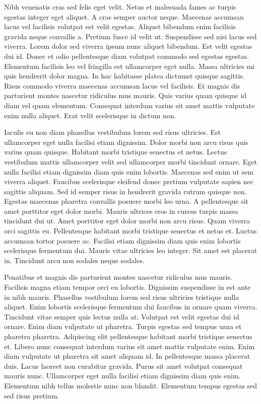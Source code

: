 \documentclass[11pt,a4paper]{article}
\begin{document}
Nibh venenatis cras sed felis eget velit. Netus et malesuada fames ac turpis egestas integer eget aliquet. A cras semper auctor neque. Maecenas accumsan lacus vel facilisis volutpat est velit egestas. Aliquet bibendum enim facilisis gravida neque convallis a. Pretium fusce id velit ut. Suspendisse sed nisi lacus sed viverra. Lorem dolor sed viverra ipsum nunc aliquet bibendum. Est velit egestas dui id. Donec et odio pellentesque diam volutpat commodo sed egestas egestas. Elementum facilisis leo vel fringilla est ullamcorper eget nulla. Massa ultricies mi quis hendrerit dolor magna. In hac habitasse platea dictumst quisque sagittis. Risus commodo viverra maecenas accumsan lacus vel facilisis. Et magnis dis parturient montes nascetur ridiculus mus mauris. Quis varius quam quisque id diam vel quam elementum. Consequat interdum varius sit amet mattis vulputate enim nulla aliquet. Erat velit scelerisque in dictum non.

Iaculis eu non diam phasellus vestibulum lorem sed risus ultricies. Est ullamcorper eget nulla facilisi etiam dignissim. Dolor morbi non arcu risus quis varius quam quisque. Habitant morbi tristique senectus et netus. Lectus vestibulum mattis ullamcorper velit sed ullamcorper morbi tincidunt ornare. Eget nulla facilisi etiam dignissim diam quis enim lobortis. Maecenas sed enim ut sem viverra aliquet. Faucibus scelerisque eleifend donec pretium vulputate sapien nec sagittis aliquam. Sed id semper risus in hendrerit gravida rutrum quisque non. Egestas maecenas pharetra convallis posuere morbi leo urna. A pellentesque sit amet porttitor eget dolor morbi. Mauris ultrices eros in cursus turpis massa tincidunt dui ut. Amet porttitor eget dolor morbi non arcu risus. Quam viverra orci sagittis eu. Pellentesque habitant morbi tristique senectus et netus et. Luctus accumsan tortor posuere ac. Facilisi etiam dignissim diam quis enim lobortis scelerisque fermentum dui. Mauris vitae ultricies leo integer. Sit amet est placerat in. Tincidunt arcu non sodales neque sodales.

Penatibus et magnis dis parturient montes nascetur ridiculus mus mauris. Facilisis magna etiam tempor orci eu lobortis. Dignissim suspendisse in est ante in nibh mauris. Phasellus vestibulum lorem sed risus ultricies tristique nulla aliquet. Enim lobortis scelerisque fermentum dui faucibus in ornare quam viverra. Tincidunt vitae semper quis lectus nulla at. Volutpat est velit egestas dui id ornare. Enim diam vulputate ut pharetra. Turpis egestas sed tempus urna et pharetra pharetra. Adipiscing elit pellentesque habitant morbi tristique senectus et. Libero nunc consequat interdum varius sit amet mattis vulputate enim. Enim diam vulputate ut pharetra sit amet aliquam id. In pellentesque massa placerat duis. Lacus laoreet non curabitur gravida. Purus sit amet volutpat consequat mauris nunc. Ullamcorper eget nulla facilisi etiam dignissim diam quis enim. Elementum nibh tellus molestie nunc non blandit. Elementum tempus egestas sed sed risus pretium.
\end{document}
